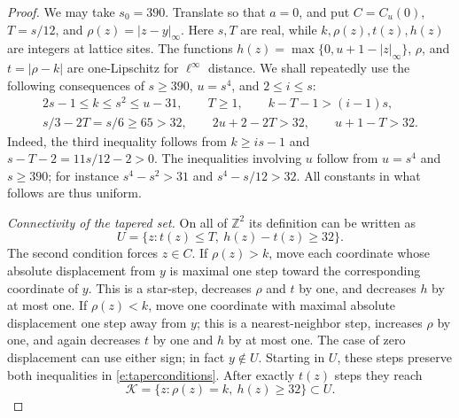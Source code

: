 \begin{proof}
We may take \(s_0=390\).  Translate so that \(a=0\), and put
\(C=C_u(0)\), \(T=s/12\), and \(\rho(z)=|z-y|_\infty\).
Here \(s,T\) are real, while \(k,\rho(z),t(z),h(z)\) are
integers at lattice sites.
The functions \(h(z)=\max\{0,u+1-|z|_\infty\}\), \(\rho\),
and \(t=|\rho-k|\) are one-Lipschitz for \(\ell^\infty\)
distance.  We shall repeatedly use the following consequences of
\(s\ge390\), \(u=s^4\), and \(2\le i\le s\):
\begin{equation}\label{e:sitecutscales}
 \begin{gathered}
 2s-1\le k\le s^2\le u-31,\qquad T\ge1,\qquad
 k-T-1>(i-1)s,\\
 s/3-2T=s/6\ge65>32,\qquad
 2u+2-2T>32,\qquad u+1-T>32.
 \end{gathered}
\end{equation}
Indeed, the third inequality follows from
\(k\ge is-1\) and \(s-T-2=11s/12-2>0\).
The inequalities involving \(u\) follow from \(u=s^4\)
and \(s\ge390\); for instance \(s^4-s^2>31\) and
\(s^4-s/12>32\).  All constants in what follows are thus uniform.

\emph{Connectivity of the tapered set.}
On all of \(\mathbb Z^2\) its definition can be written as
\begin{equation}\label{e:taperconditions}
 U=\{z:t(z)\le T,\ h(z)-t(z)\ge32\}.
\end{equation}
The second condition forces \(z\in C\).
If \(\rho(z)>k\), move each coordinate whose absolute
displacement from \(y\) is maximal one step toward the corresponding
coordinate of \(y\).  This is a star-step, decreases \(\rho\)
and \(t\) by one, and decreases \(h\) by at most one.
If \(\rho(z)<k\), move one coordinate with maximal absolute
displacement one step away from \(y\); this is a nearest-neighbor
step, increases \(\rho\) by one, and again decreases \(t\) by
one and \(h\) by at most one.  The case of zero displacement can
use either sign; in fact \(y\notin U\).  Starting in \(U\),
these steps preserve both inequalities in
\eqref{e:taperconditions}.  After exactly \(t(z)\) steps they
reach
\[
 \mathcal K=\{z:\rho(z)=k,\ h(z)\ge32\}\subset U.
\]


\end{proof}
